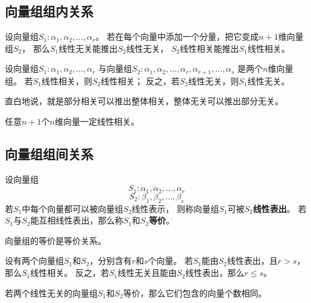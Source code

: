 \subsection{向量组组内关系}
\begin{theorem}[接长与补短]
  设向量组$S_1: \alpha_1,\alpha_2,\dots,\alpha_r$。
  若在每个向量中添加一个分量，把它变成$n+1$维向量组$S_2$，
  那么$S_1$线性无关能推出$S_2$线性无关，
  $S_2$线性相关能推出$S_1$线性相关。
\end{theorem}

\begin{theorem}[部分与整体]
  设向量组$S_1: \alpha_1,\alpha_2,\dots,\alpha_r$
  与向量组$S_2: \alpha_1,\alpha_2,\dots,\alpha_r,\alpha_{r+1},\dots,\alpha_s$
  是两个$n$维向量组。
  若$S_1$线性相关，则$S_2$线性相关；
  反之，若$S_2$线性无关，则$S_1$线性无关。
\end{theorem}

\begin{remark}
  直白地说，就是部分相关可以推出整体相关，整体无关可以推出部分无关。
\end{remark}

\begin{theorem}
  任意$n+1$个$n$维向量一定线性相关。
\end{theorem}

\subsection{向量组组间关系}
\begin{definition}[向量组等价]
  设向量组
  \[ S_1: \alpha_1,\alpha_2,\dots,\alpha_r \]
  \[ S_2: \beta_1,\beta_2,\dots,\beta_s \]
  若$S_1$中每个向量都可以被向量组$S_2$线性表示，
  则称向量组$S_1$可被$S_2$\textbf{线性表出}。
  若$S_1$与$S_2$能互相线性表出，那么称$S_1$和$S_2$\textbf{等价}。
\end{definition}

\begin{remark}
  向量组的等价是等价关系。
\end{remark}

\begin{theorem} \label{thrm-vector-set-size}
  设有两个向量组$S_1$和$S_2$，分别含有$r$和$s$个向量。
  若$S_1$能由$S_2$线性表出，且$r > s$，那么$S_1$线性相关。
  反之，若$S_1$线性无关且能由$S_2$线性表出，那么$r \le s$。
\end{theorem}

\begin{corollary} \label{thrm-vector-set-equiv}
  若两个线性无关的向量组$S_1$和$S_2$等价，那么它们包含的向量个数相同。
\end{corollary}

